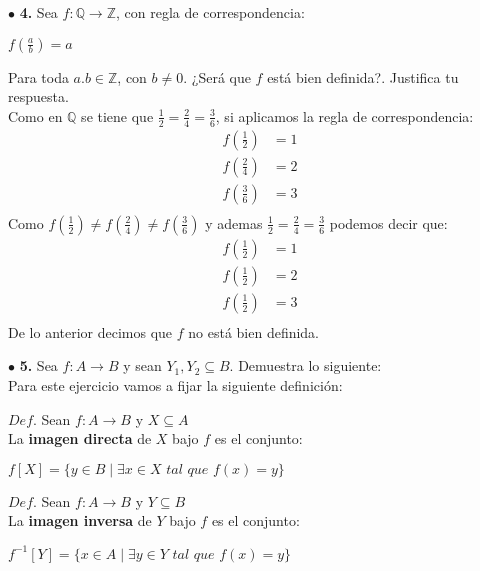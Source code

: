 \documentclass[12pt]{article}
\begin{document}
\vspace{0.5cm}
%
%
$\bullet$ \textbf{4.} Sea ${\displaystyle f: \mathbb{Q} \longrightarrow \mathbb{Z}}$, con regla de correspondencia:\\
\begin{center}
    ${\displaystyle f\left(\frac{a}{b}\right) = a}$
\end{center}
Para toda $a.b \in \mathbb{Z}$, con $b \neq 0$. ¿Será que ${\displaystyle f}$ está bien definida?. Justifica tu respuesta.\\

Como en $\mathbb{Q}$ se tiene que $\frac{1}{2} = \frac{2}{4} = \frac{3}{6}$, si aplicamos la regla de correspondencia:\\

\begin{align*}
    f\left(\frac{1}{2}\right) &= 1\\
    f\left(\frac{2}{4}\right) &= 2\\
    f\left(\frac{3}{6}\right) &= 3\\
\end{align*}
Como $f\left(\frac{1}{2}\right) \neq f\left(\frac{2}{4}\right) \neq f\left(\frac{3}{6}\right)$ y ademas $\frac{1}{2} = \frac{2}{4} = \frac{3}{6}$
podemos decir que:
\begin{align*}
    f\left(\frac{1}{2}\right) &= 1\\
    f\left(\frac{1}{2}\right) &= 2\\
    f\left(\frac{1}{2}\right) &= 3\\
\end{align*}
De lo anterior decimos que $f$ no está bien definida.

\vspace{0.5cm}
%
%
$\bullet$ \textbf{5.} Sea ${\displaystyle f: A \longrightarrow B}$ y sean $Y_1, Y_2 \subseteq B$. Demuestra lo siguiente:\\

    Para este ejercicio vamos a fijar la siguiente definición:
    \begin{tcolorbox}[title=\textbf{Definiciones}, colback=blue!15!white, colframe=black!, breakable]
        $Def$. Sean $f: A \longrightarrow B$ y $X \subseteq A$\\
        La \textbf{imagen directa} de $X$ bajo $f$ es el conjunto:
        \begin{center}
            $f[X] = \{y \in B \mid \exists x \in X \textit{ tal que } f(x) = y\}$
        \end{center}
        $Def$. Sean $f: A \longrightarrow B$ y $Y \subseteq B$\\
        La \textbf{imagen inversa} de $Y$ bajo $f$ es el conjunto:
        \begin{center}
            $f^{-1}[Y] = \{x \in A \mid \exists y \in Y \textit{ tal que } f(x) = y\}$
        \end{center}    
    \end{tcolorbox}
\end{document}
